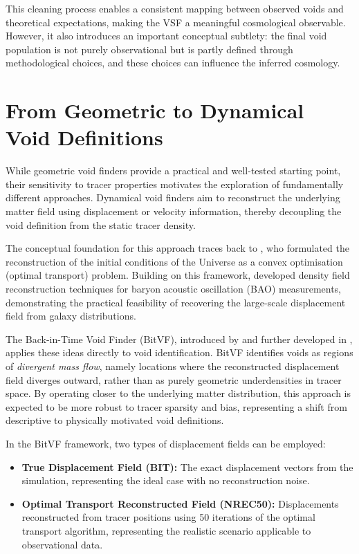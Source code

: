 \documentclass[12pt]{report}
\begin{document}
This cleaning process enables a consistent mapping between observed voids and theoretical expectations, making the VSF a meaningful cosmological observable. However, it also introduces an important conceptual subtlety: the final void population is not purely observational but is partly defined through methodological choices, and these choices can influence the inferred cosmology.


\section{From Geometric to Dynamical Void Definitions}

While geometric void finders provide a practical and well-tested starting point, their sensitivity to tracer properties motivates the exploration of fundamentally different approaches. Dynamical void finders aim to reconstruct the underlying matter field using displacement or velocity information, thereby decoupling the void definition from the static tracer density.

The conceptual foundation for this approach traces back to \citet{Brenier2003}, who formulated the reconstruction of the initial conditions of the Universe as a convex optimisation (optimal transport) problem. Building on this framework, \citet{Eisenstein2007} developed density field reconstruction techniques for baryon acoustic oscillation (BAO) measurements, demonstrating the practical feasibility of recovering the large-scale displacement field from galaxy distributions.

The Back-in-Time Void Finder (BitVF), introduced by \citet{Sartori2025} and further developed in \citet{Sartori2026}, applies these ideas directly to void identification. BitVF identifies voids as regions of \emph{divergent mass flow}, namely locations where the reconstructed displacement field diverges outward, rather than as purely geometric underdensities in tracer space. By operating closer to the underlying matter distribution, this approach is expected to be more robust to tracer sparsity and bias, representing a shift from descriptive to physically motivated void definitions.

In the BitVF framework, two types of displacement fields can be employed:
\begin{itemize}
    \item \textbf{True Displacement Field (BIT):} The exact displacement vectors from the simulation, representing the ideal case with no reconstruction noise.
    \item \textbf{Optimal Transport Reconstructed Field (NREC50):} Displacements reconstructed from tracer positions using 50 iterations of the optimal transport algorithm, representing the realistic scenario applicable to observational data.
\end{itemize}
\end{document}
